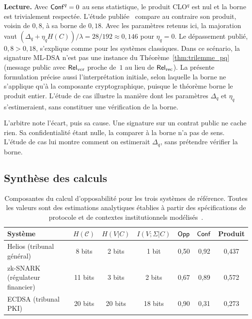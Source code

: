 \begin{sloppypar}
\noindent\textbf{Lecture.} Avec $\mathsf{Conf}^q = 0$ au sens statistique, le produit
CLO$^q$ est nul et la borne est trivialement respect\'ee. L'\'etude publi\'ee~\cite{MINKA2026PQCRO}
compare au contraire son produit, voisin de $0{,}8$, \`a sa borne de $0{,}18$. Avec les param\`etres
retenus ici, la majoration vaut $(\Delta_q + \eta_q H(C))/\lambda = 28/192 \approx 0{,}146$ pour $\eta_q = 0$.
Le d\'epassement publi\'e, $0{,}8 > 0{,}18$, s'explique comme pour les syst\`emes classiques. Dans ce sc\'enario,
la signature ML-DSA n'est pas une instance du
Th\'eor\`eme~\ref{thm:trilemme_pq} (message public avec $\mathsf{Rel}_{\mathrm{ver}}$ proche
de~$1$ au lieu de $\mathsf{Rel}_{\mathrm{rec}}$). La pr\'esente formulation pr\'ecise aussi
l'interpr\'etation initiale, selon laquelle \og la borne ne s'applique qu'\`a la
composante cryptographique\fg{}, puisque le th\'eor\`eme borne le produit entier.
L'\'etude de cas illustre la mani\`ere dont les param\`etres $\Delta_q$ et $\eta_q$
s'estimeraient, sans constituer une v\'erification de la borne.

\begin{boiteArbitre}
L'arbitre note l'\'ecart, puis sa cause. Une signature sur un contrat public
ne cache rien. Sa confidentialit\'e \'etant nulle, la comparer \`a la borne n'a
pas de sens. L'\'etude de cas lui montre comment on estimerait $\Delta_q$,
sans pr\'etendre v\'erifier la borne.
\end{boiteArbitre}

\subsection{Synth\`ese des calculs}
\label{sec:synthese_derivations}

\begin{table}[htbp]
\centering
\caption{Composantes du calcul d'opposabilit\'e pour les trois syst\`emes de
r\'ef\'erence. Toutes les valeurs sont des estimations analytiques \'etablies
\`a partir des sp\'ecifications de protocole et de contextes institutionnels
mod\'elis\'es~\cite{MINKA2026CLO}.}
\label{tab:composantes_opposabilite}
\small
\begin{tabular}{@{}lcccccc@{}}
\toprule
\textbf{Syst\`eme} & $H(\mathcal{C})$ & $H(V|C)$ & $I(V;\Sigma|C)$ & $\mathsf{Opp}$ &
$\mathsf{Conf}$ & \textbf{Produit} \\
\midrule
Helios (tribunal g\'en\'eral) & 8 bits & 2 bits & 1 bit & 0{,}50 & 0{,}92 & 0{,}437 \\
zk-SNARK (r\'egulateur financier) & 11 bits & 3 bits & 2 bits & 0{,}67 & 0{,}89 & 0{,}572 \\
ECDSA (tribunal PKI) & 20 bits & 20 bits & 18 bits & 0{,}90 & 0{,}31 & 0{,}273 \\
\bottomrule
\end{tabular}
\end{table}


\end{sloppypar}
